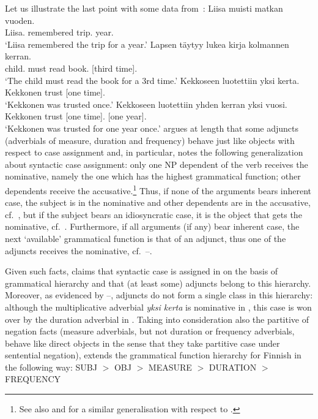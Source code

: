 \documentclass[output=paper]{langsci/langscibook}
\begin{document}
Let us illustrate the last point with some  data from~\citealt{mali:93}:
\eal
\label{subj}
\ex \gll Liisa muisti matkan vuoden. \\
    Liisa.\NOM{} remembered trip.\ACC{} year.\ACC{}\\
\glt  `Liisa remembered the trip for a year.'
\ex
\label{adv1bis}\label{obj}
\gll Lapsen täytyy lukea kirja \phtm{[}kolmannen kerran. \\
    child.\GEN{} must read book.\NOM{} [third time].\ACC{}\\
\glt  `The child must read the book for a 3rd time.'
\ex
\label{adv1}
\gll Kekkoseen luotettiin \phtm{[}yksi kerta. \\
    Kekkonen\Ill{} trust\PassP{} [one time].\NOM{}\\
\glt `Kekkonen was trusted once.'
\ex
\label{adv2}
\gll Kekkoseen luotettiin \phtm{[}yhden kerran \phtm{[}yksi vuosi. \\
    Kekkonen\Ill{} trust\PassP{} [one time].\ACC{} [one year].\NOM{}\\
\glt  `Kekkonen was trusted for one year once.'
\zl
\citet{mali:93} argues at length that some adjuncts (adverbials of measure,
duration and frequency) behave just like objects with respect to case
assignment and, in particular, notes the following generalization about
syntactic case assignment: only one NP dependent of the verb receives the
nominative, namely the one which has the highest grammatical function;
other dependents receive the accusative.\footnote{See also
  \citealt{zae:mal:83} and \citealt{ZMT85a} for a similar generalisation with respect to
  .}  Thus, if none of the arguments bears inherent case, the
subject is in the nominative and other dependents are in the accusative, cf.~, but if the subject bears an idiosyncratic case, it is the
object that gets the nominative, cf.~.  Furthermore, if all arguments
(if any) bear inherent case, the next `available’ grammatical function is
that of an adjunct, thus one of the adjuncts receives the nominative, 
cf.~–.

Given such facts,
\citet{mali:93} claims that syntactic case is assigned in  on
the basis of grammatical hierarchy and that (at least some) adjuncts
belong to this hierarchy.  Moreover, as evidenced by
–, adjuncts do not form a single class in this
hierarchy: although the multiplicative adverbial \emph{yksi kerta} is
nominative in , this case is won over by the duration
adverbial in . Taking into consideration also the partitive
of negation facts (measure adverbials, but not duration or frequency
adverbials, behave like direct objects in the sense that they take
partitive case under sentential negation), \citet{mali:93} extends the
grammatical function hierarchy for Finnish in the following way:
\ea
SUBJ $>$ OBJ $>$ MEASURE $>$ DURATION $>$ FREQUENCY
\z
\end{document}
